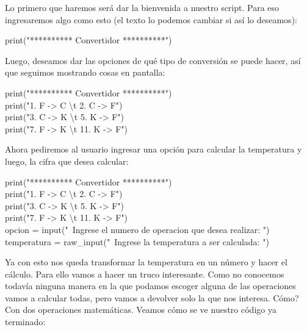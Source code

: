 \documentclass[10pt,letterpaper]{article}
\newenvironment{Code}
{
\begin{lrbox}{\selvestebox}%
\begin{minipage}{\dimexpr\columnwidth-2\fboxsep\relax}
\fontfamily{\ttdefault}\selectfont
}
{\end{minipage}\end{lrbox}%
\begin{center}
\colorbox{light-gray}{\usebox{\selvestebox}}
\end{center}
}
\begin{document}
\noindent Lo primero que haremos ser\'a dar la bienvenida a nuestro script. Para eso ingresaremos algo como esto (el texto lo podemos cambiar si as\'i lo deseamos):

\begin{Code}
print("********** Convertidor **********")
\end{Code}

\noindent Luego, deseamos dar las opciones de qu\'e tipo de conversi\'on se puede hacer, as\'i que seguimos mostrando cosas en pantalla:

\begin{Code}
print("********** Convertidor **********")\\
print("1. F -> C \textbackslash t  2. C -> F")\\
print("3. C -> K \textbackslash t  5. K -> F")\\
print("7. F -> K \textbackslash t 11. K -> F")
\end{Code}

\noindent Ahora pediremos al usuario ingresar una opci\'on para calcular la temperatura y luego, la cifra que desea calcular:

\begin{Code}
print("********** Convertidor **********")\\
print("1. F -> C \textbackslash t  2. C -> F")\\
print("3. C -> K \textbackslash t  5. K -> F")\\
print("7. F -> K \textbackslash t 11. K -> F")\\
opcion = input("\ \hspace{-2mm}Ingrese el numero de operacion que desea realizar: ")\\
temperatura = raw\_input("\ \hspace{-2mm}Ingrese la temperatura a ser calculada: ")
\end{Code}

\noindent Ya con esto nos queda transformar la temperatura en un n\'umero y hacer el c\'alculo. Para ello vamos a hacer un truco interesante. Como no conocemos todav\'ia ninguna manera en la que podamos escoger alguna de las operaciones vamos a calcular todas, pero vamos a devolver solo la que nos interesa. C\'omo? Con dos operaciones matem\'aticas. Veamos c\'omo se ve nuestro c\'odigo ya terminado:
\end{document}
